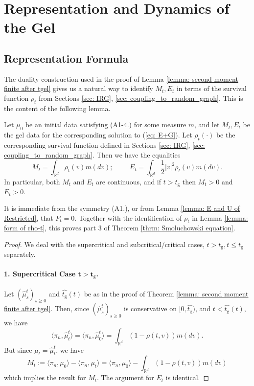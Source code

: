 \section{Representation and Dynamics of the Gel} \label{sec: gel dynamics}
\subsection{Representation Formula} 

The duality construction used in the proof of Lemma \ref{lemma: second moment finite after tgel} gives us a natural way to identify $M_t, E_t$ in terms of the survival function $\rho_t$ from Sections \ref{sec: IRG}, \ref{sec: coupling_to_random_graph}. This is the content of the following lemma. \begin{lemma}\label{lemma: representation of M, E} Let $\mu_0$ be an initial data satisfying (A1-4.) for some measure $m$, and let $M_t, E_t$ be the gel data for the corresponding solution to (\ref{eq: E+G}). Let $\rho_t(\cdot)$ be the corresponding survival function defined in Sections \ref{sec: IRG}, \ref{sec: coupling_to_random_graph}. Then we have the equalities \begin{equation}\label{eq: formula for M, E}
    M_t = \int_{\mathbb{R}^d} \rho_t(v)m(dv); \hspace{1cm} E_t=\int_{\mathbb{R}^d} \frac{1}{2}|v|^2\rho_t(v)m(dv).
\end{equation} In particular, both $M_t$ and $E_t$ are continuous, and if $t>t_\mathrm{g}$ then $M_t>0$ and $E_t>0$. \end{lemma} It is immediate from the symmetry (A1.), or from Lemma \ref{lemma: E and U of Restricted}, that $P_t=0$. Together with the identification of $\rho_t$ in Lemma \ref{lemma: form of rho-t}, this proves part 3 of Theorem \ref{thrm: Smoluchowski equation}. \begin{proof} We deal with the supercritical and subcritical/critical cases, $t>t_\mathrm{g}, t\le t_\mathrm{g}$ separately. 
\paragraph{1. Supercritical Case $\mathbf{t>t_\mathrm{g}}$.}  Let $(\widehat{\mu}^t_s)_{s\geq 0}$ and $\widehat{t_\mathrm{g}}(t)$ be as in the proof of Theorem \ref{lemma: second moment finite after tgel}. Then, since $(\widehat{\mu}^t_s)_{s\geq 0}$ is conservative on $[0, \widehat{t_\mathrm{g}})$, and $t<\widehat{t_\mathrm{g}}(t)$, we have \begin{equation}
    \langle \pi_n, \widehat{\mu}^t_t\rangle =\langle \pi_n, \widehat{\mu}^t_0\rangle = \int_{\mathbb{R}^d} (1-\rho(t,v))m(dv).
\end{equation} But since $\mu_t=\widehat{\mu}^t_t$, we have \begin{equation}
    M_t:=\langle \pi_n, \mu_0\rangle -\langle \pi_n, \mu_t\rangle =\langle \pi_n, \mu_0\rangle - \int_{\mathbb{R}^d} (1-\rho(t,v))m(dv)
\end{equation} which implies the result for $M_t$. The argument for $E_t$ is identical. 


\end{proof}

